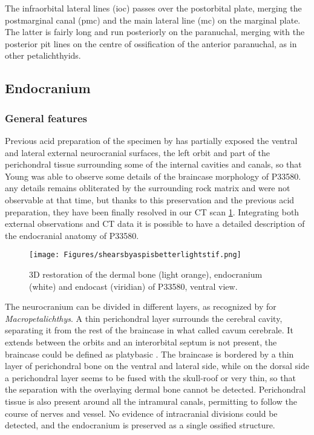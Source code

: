 \documentclass[12pt,letterpaper]{article}
\begin{document}
The infraorbital lateral lines (ioc) passes over the postorbital plate, merging the postmarginal canal (pmc) and the main lateral line (mc) on the marginal plate. The latter is fairly long and run posteriorly on the paranuchal, merging with the posterior pit lines on the centre of ossification of the anterior paranuchal, as in other petalichthyids. 

\subsection{Endocranium}
\subsubsection{General features}

Previous acid preparation of the specimen by \citep{Young1985} has partially exposed the ventral and lateral external neurocranial surfaces, the left orbit and part of the perichondral tissue surrounding some of the internal cavities and canals, so that Young was able to observe some details of the braincase morphology of P33580. any details remains obliterated by the surrounding rock matrix and were not observable at that time, but thanks to this preservation and the previous acid preparation, they have been finally resolved in our CT scan \ref{ventral3D}. Integrating both external observations and CT data it is possible to have a detailed description of the endocranial anatomy of P33580.

\begin{figure}[!h]
\centering
    \texttt{[image: Figures/shearsbyaspisbetterlightstif.png]}
\caption{\footnotesize{3D restoration of the dermal bone (light orange), endocranium (white) and endocast (viridian) of P33580, ventral view.}}
\label{ventral3D}
\end{figure}

The neurocranium can be divided in different layers, as recognized by \cite{Stensio1925} for \textit{Macropetalichthys}. A thin perichondral layer surrounds the cerebral cavity, separating it from the rest of the braincase in what \cite{Stensio1925} called cavum cerebrale. It extends between the orbits and an interorbital septum is not present, the braincase could be defined as platybasic \citep{maisey2007braincase}. The braincase is bordered by a thin layer of perichondral bone on the ventral and lateral side, while on the dorsal side a perichondral layer seems to be fused with the skull-roof or very thin, so that the separation with the overlaying dermal bone cannot be detected. Perichondral tissue is also present around all the intramural canals, permitting to follow the course of nerves and vessel. No evidence of intracranial divisions could be detected, and the endocranium is preserved as a single ossified structure.
\end{document}

